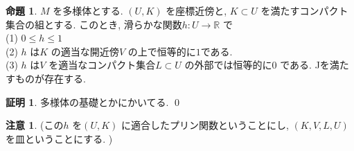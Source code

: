 \documentclass[10pt, fleqn, label-section=none]{bxjsarticle}
\theoremstyle{definition}
\newtheorem{prop}[dfn]{命題}
\newtheorem*{pf*}{証明}
\newtheorem{remark}[dfn]{注意}
\renewcommand{\;}{\, ; \,}
\begin{document}
\begin{prop}$M$ を多様体とする. $(U, K)$ を座標近傍と, $K \subset U$ を満たすコンパクト集合の組とする. このとき, 滑らかな関数$h : U \rightarrow \mathbb R$ で\\
(1) $0 \leq h \leq 1$ \\
(2) $h$ は$K$ の適当な開近傍$V$ の上で恒等的に$1$である. \\
(3) $h$ は$V$ を適当なコンパクト集合$L \subset U$ の外部では恒等的に$0$ である. ^^
を満たすものが存在する. 

\end{prop}
\begin{pf*}
多様体の基礎とかにかいてる.
\qed
\end{pf*}

\begin{remark}
(この$h$ を$(U, K)$ に適合したプリン関数ということにし, $(K,V,L,U)$ を皿ということにする. ) 
\end{remark}
\end{document}
